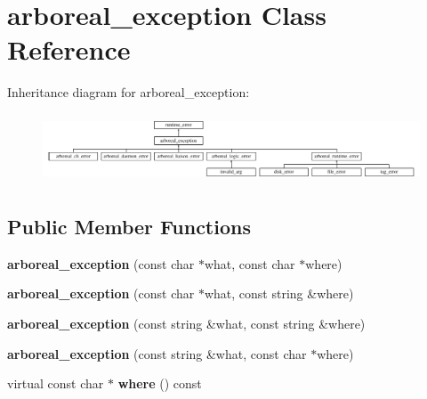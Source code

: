 \hypertarget{classarboreal__exception}{}\section{arboreal\+\_\+exception Class Reference}
\label{classarboreal__exception}
Inheritance diagram for arboreal\+\_\+exception\+:\begin{figure}[H]
\begin{center}
\leavevmode
\includegraphics[height=2.064516cm]{classarboreal__exception}
\end{center}
\end{figure}
\subsection*{Public Member Functions}
\begin{DoxyCompactItemize}
\item 
\mbox{\label{classarboreal__exception_a45ed8be47f52411504834440c481bc5f}} 
{\bfseries arboreal\+\_\+exception} (const char $\ast$what, const char $\ast$where)
\item 
\mbox{\label{classarboreal__exception_a7d89267e972d47ac4052e3d6c94ee73b}} 
{\bfseries arboreal\+\_\+exception} (const char $\ast$what, const string \&where)
\item 
\mbox{\label{classarboreal__exception_a3a3f2a7034c07dc5fe694ff860c0d4b4}} 
{\bfseries arboreal\+\_\+exception} (const string \&what, const string \&where)
\item 
\mbox{\label{classarboreal__exception_ac3099afc0a14eed3408dfffaac47d4ca}} 
{\bfseries arboreal\+\_\+exception} (const string \&what, const char $\ast$where)
\item 
\mbox{\label{classarboreal__exception_a802003dee586aaeb0b0d7ce909da2dad}} 
virtual const char $\ast$ {\bfseries where} () const
\end{DoxyCompactItemize}
